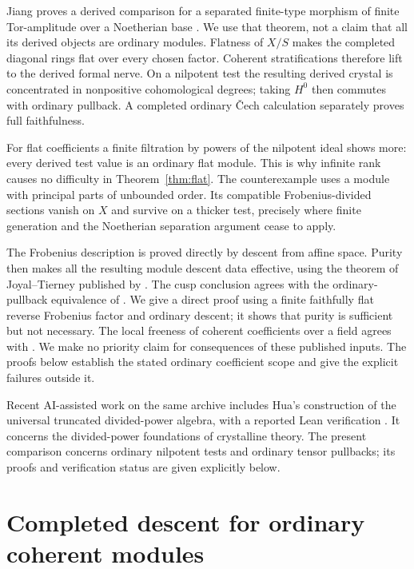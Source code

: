 \documentclass[11pt]{article}
\theoremstyle{definition}\newtheorem{definition}[theorem]{Definition}
\theoremstyle{remark}\newtheorem{remark}[theorem]{Remark}
\begin{document}
Jiang proves a derived comparison for a separated finite-type morphism of finite Tor-amplitude over a Noetherian base \citep[Theorem~2.1, Remark~2.4, Proposition~6.2 and Theorem~6.3, pp.~16--17 and 32--34]{Jiang}. We use that theorem, not a claim that all its derived objects are ordinary modules. Flatness of $X/S$ makes the completed diagonal rings flat over every chosen factor. Coherent stratifications therefore lift to the derived formal nerve. On a nilpotent test the resulting derived crystal is concentrated in nonpositive cohomological degrees; taking $H^0$ then commutes with ordinary pullback. A completed ordinary \v{C}ech calculation separately proves full faithfulness.

For flat coefficients a finite filtration by powers of the nilpotent ideal shows more: every derived test value is an ordinary flat module. This is why infinite rank causes no difficulty in Theorem~\ref{thm:flat}. The counterexample uses a module with principal parts of unbounded order. Its compatible Frobenius-divided sections vanish on $X$ and survive on a thicker test, precisely where finite generation and the Noetherian separation argument cease to apply.

The Frobenius description is proved directly by descent from affine space. Purity then makes all the resulting module descent data effective, using the theorem of Joyal--Tierney published by \citet[Theorem~4, p.~41]{Mesablishvili}. The cusp conclusion agrees with the ordinary-pullback equivalence of \citet[Proposition~2.11, Theorems~3.11 and~4.3, Remark~4.5]{BenZviNevins}. We give a direct proof using a finite faithfully flat reverse Frobenius factor and ordinary descent; it shows that purity is sufficient but not necessary. The local freeness of coherent coefficients over a field agrees with \citet[Theorem~6.8(3)--(4), arXiv pp.~22--25]{ToniniZhang}. We make no priority claim for consequences of these published inputs. The proofs below establish the stated ordinary coefficient scope and give the explicit failures outside it.

Recent AI-assisted work on the same archive includes Hua's construction of the universal truncated divided-power algebra, with a reported Lean verification \citep[\S35, Theorems~35.1--35.3, pp.~161--162]{Hua}. It concerns the divided-power foundations of crystalline theory. The present comparison concerns ordinary nilpotent tests and ordinary tensor pullbacks; its proofs and verification status are given explicitly below.

\section{Completed descent for ordinary coherent modules}
\end{document}
